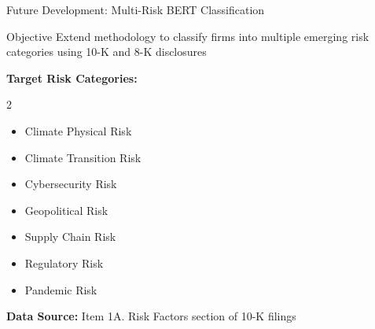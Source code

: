 \documentclass[aspectratio=169]{beamer}
\begin{document}
%
%
\begin{frame}{Future Development: Multi-Risk BERT Classification}
\begin{block}{Objective}
Extend methodology to classify firms into multiple emerging risk categories using 10-K and 8-K disclosures
\end{block}

\textbf{Target Risk Categories:}
\begin{multicols}{2}
\begin{itemize}
    \item Climate Physical Risk
    \item Climate Transition Risk
    \item Cybersecurity Risk
    \item Geopolitical Risk
    \item Supply Chain Risk
    \item Regulatory Risk
    \item Pandemic Risk
\end{itemize}
\end{multicols}

\textbf{Data Source:} Item 1A. Risk Factors section of 10-K filings
\end{frame}
%
%
\end{document}
